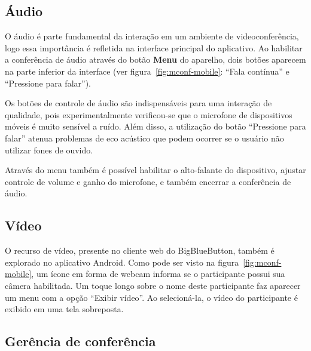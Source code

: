 \documentclass{acm_proc_article-sp}
\begin{document}
\subsection{Áudio}

O áudio é parte fundamental da interação em um ambiente de videoconferência, logo essa importância é refletida na interface principal do aplicativo. Ao habilitar a conferência de áudio através do botão \textbf{Menu} do aparelho, dois botões aparecem na parte inferior da interface (ver figura~\ref{fig:mconf-mobile}: ``Fala contínua'' e ``Pressione para falar'').

Os botões de controle de áudio são indispensáveis para uma interação de qualidade, pois experimentalmente verificou-se que o microfone de dispositivos móveis é muito sensível a ruído. Além disso, a utilização do botão ``Pressione para falar'' atenua problemas de eco acústico que podem ocorrer se o usuário não utilizar fones de ouvido.

Através do menu também é possível habilitar o alto-falante do dispositivo, ajustar controle de volume e ganho do microfone, e também encerrar a conferência de áudio.

\subsection{Vídeo}


O recurso de vídeo, presente no cliente web do BigBlueButton, também é explorado no aplicativo Android. Como pode ser visto na figura~\ref{fig:mconf-mobile}, um ícone em forma de webcam informa se o participante possui sua câmera habilitada. Um toque longo sobre o nome deste participante faz aparecer um menu com a opção ``Exibir vídeo''. Ao selecioná-la, o vídeo do participante é exibido em uma tela sobreposta.

\subsection{Gerência de conferência}
\end{document}
